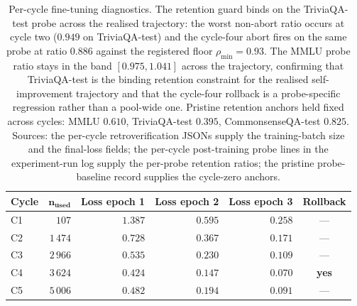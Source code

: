 \begin{table}[!htbp]
\centering\footnotesize
\setlength{\tabcolsep}{5pt}
\renewcommand{\arraystretch}{1.1}
\begin{tabular}{@{}lrrrrc@{}}
\toprule
\textbf{Cycle} & $\boldsymbol{n_{\text{used}}}$ & \textbf{Loss epoch 1} & \textbf{Loss epoch 2} & \textbf{Loss epoch 3} & \textbf{Rollback} \\
\midrule
C1 & $107$    & $1.387$ & $0.595$ & $0.258$ & --- \\
C2 & $1\,474$ & $0.728$ & $0.367$ & $0.171$ & --- \\
C3 & $2\,966$ & $0.535$ & $0.230$ & $0.109$ & --- \\
C4 & $3\,624$ & $0.424$ & $0.147$ & $0.070$ & \textbf{yes} \\
C5 & $5\,006$ & $0.482$ & $0.194$ & $0.091$ & --- \\
\bottomrule
\end{tabular}
\caption[Per-cycle fine-tuning diagnostics]{Per-cycle fine-tuning diagnostics. The retention guard binds on the TriviaQA-test probe across the realised trajectory: the worst non-abort ratio occurs at cycle two ($0.949$ on TriviaQA-test) and the cycle-four abort fires on the same probe at ratio $0.886$ against the registered floor $\rho_{\min} = 0.93$. The MMLU probe ratio stays in the band $[0.975, 1.041]$ across the trajectory, confirming that TriviaQA-test is the binding retention constraint for the realised self-improvement trajectory and that the cycle-four rollback is a probe-specific regression rather than a pool-wide one. Pristine retention anchors held fixed across cycles: MMLU $0.610$, TriviaQA-test $0.395$, CommonsenseQA-test $0.825$. Sources: the per-cycle retroverification JSONs supply the training-batch size and the final-loss fields; the per-cycle post-training probe lines in the experiment-run log supply the per-probe retention ratios; the pristine probe-baseline record supplies the cycle-zero anchors.}
\label{tab:app-per-cycle-ft}
\end{table}
